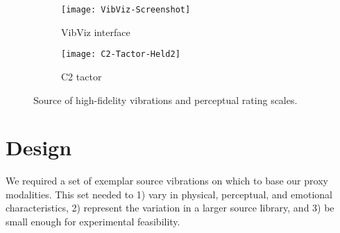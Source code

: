 \begin{figure}[tb]
\centering
\begin{subfigure}{0.28\textwidth}
        		\centering
	    	 \texttt{[image: VibViz-Screenshot]}
            \caption{VibViz interface ~\cite{Seifi2015}}
            \label{fig:vibviz}
         \end{subfigure}
         \qquad
	\begin{subfigure}{0.19\textwidth}
    	\centering
     	 \texttt{[image: C2-Tactor-Held2]}
            \caption{C2 tactor}
            \label{fig:c2tactor}
         \end{subfigure}
            \label{fig:approach}
            \caption{Source of high-fidelity vibrations and perceptual rating scales.}
\end{figure}


\section{Design}%


We required a set of exemplar source vibrations on which to base our proxy modalities. 
This set needed to
1) vary in physical, perceptual, and %
emotional characteristics,
2) represent the variation in a larger source library, and
3) be small enough for experimental feasibility.

